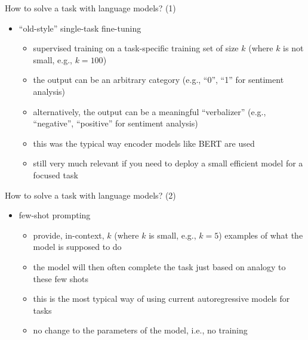 \begin{frame}{How to solve a task with language models? (1)}

\vfill

\begin{itemize}
    \item ``old-style'' single-task fine-tuning 
        \begin{itemize}
            \item supervised training on a task-specific
        training set of size $k$ (where $k$ is not small,
        e.g., $k=100$)
        \item the output can be an arbitrary category (e.g.,
        ``0'', ``1'' for sentiment analysis)
            \item alternatively, the output can be a
        meaningful ``verbalizer'' (e.g., ``negative'',
        ``positive'' for sentiment analysis)
        \item this was the typical way encoder models like
        BERT are used
        \item still very much relevant if you need to deploy
        a small efficient model for a focused task
        \end{itemize}
\end{itemize}

\vfill

\end{frame}












\begin{frame}{How to solve a task with language models? (2)}

\vfill

\begin{itemize}
    \item few-shot prompting
        \begin{itemize}
            \item provide, in-context,  $k$ (where $k$ is small, e.g., $k=5$) examples of what the model is
supposed to do
        \item the model will then often complete the task
        just based on analogy to these few shots
        \item this is the most typical way of using current
        autoregressive models for tasks
\item no change to the parameters of the model, i.e., no training
\end{itemize}
\end{itemize}

\vfill

\end{frame}

